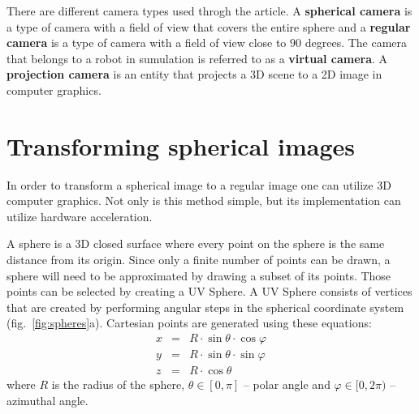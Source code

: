 \documentclass{svproc}
\begin{document}

There are different camera types used throgh the article. A \textbf{spherical camera} is a type of camera with a field of view that covers the entire sphere and a \textbf{regular camera} is a type of camera with a field of view close to $90$ degrees.
The camera that belongs to a robot in sumulation is referred to as a \textbf{virtual camera}.
A \textbf{projection camera} is an entity that projects a 3D scene to a 2D image in computer graphics.




\section{Transforming spherical images}
\label{sec:spherical}

In order to transform a spherical image to a regular image one can utilize 3D computer graphics.
Not only is this method simple, but its implementation can utilize hardware acceleration.

A sphere is a 3D closed surface where every point on the sphere is the same distance from its origin.
Since only a finite number of points can be drawn, a sphere will need to be approximated by drawing a subset of its points.
Those points can be selected by creating a UV Sphere.
A UV Sphere consists of vertices that are created by performing angular steps in the spherical coordinate system (fig.~\ref{fig:spheres}a).
Cartesian points are generated using these equations:
\begin{eqnarray}
    x &=& R \cdot \sin \theta \cdot \cos \varphi \nonumber \\
    y &=& R \cdot \sin \theta \cdot \sin \varphi \\
    z &=& R \cdot \cos \theta \nonumber
\end{eqnarray}
where $R$ is the radius of the sphere, $\theta \in [0, \pi]$ -- polar angle and $\varphi \in [0, 2\pi)$ -- azimuthal angle.
\end{document}
